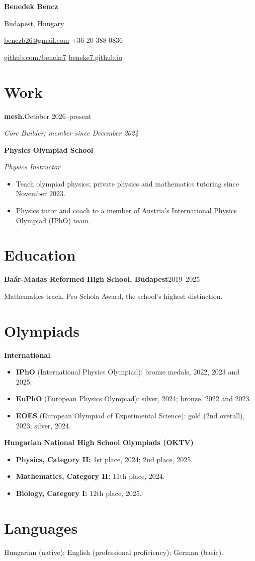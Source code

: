 \documentclass[11pt,a4paper]{article}
\begin{document}
{\LARGE\bfseries Benedek Bencz}\par
Budapest, Hungary\par
\href{mailto:benczb26@gmail.com}{benczb26@gmail.com}
\enspace\textbar\enspace +36 20 388 0836\par
\href{https://github.com/beneke7}{github.com/beneke7}
\enspace\textbar\enspace \href{https://beneke7.github.io}{beneke7.github.io}

\section{Work}

\textbf{mesh.}\hfill October 2026--present\par
\textit{Core Builder; member since December 2024}

\textbf{Physics Olympiad School}\par
\textit{Physics Instructor}
\begin{itemize}
  \item Teach olympiad physics; private physics and mathematics tutoring since November 2023.
  \item Physics tutor and coach to a member of Austria's International Physics Olympiad (IPhO) team.
\end{itemize}

\section{Education}
\textbf{Baár-Madas Reformed High School, Budapest}\hfill 2019--2025\par
Mathematics track. Pro Schola Award, the school's highest distinction.

\section{Olympiads}
\textbf{International}
\begin{itemize}
  \item \textbf{IPhO} (International Physics Olympiad): bronze medals, 2022, 2023 and 2025.
  \item \textbf{EuPhO} (European Physics Olympiad): silver, 2024; bronze, 2022 and 2023.
  \item \textbf{EOES} (European Olympiad of Experimental Science): gold (2nd overall), 2023; silver, 2024.
\end{itemize}

\textbf{Hungarian National High School Olympiads (OKTV)}
\begin{itemize}
  \item \textbf{Physics, Category II:} 1st place, 2024; 2nd place, 2025.
  \item \textbf{Mathematics, Category II:} 11th place, 2024.
  \item \textbf{Biology, Category I:} 12th place, 2025.
\end{itemize}

\section{Languages}
Hungarian (native); English (professional proficiency); German (basic).
\end{document}
